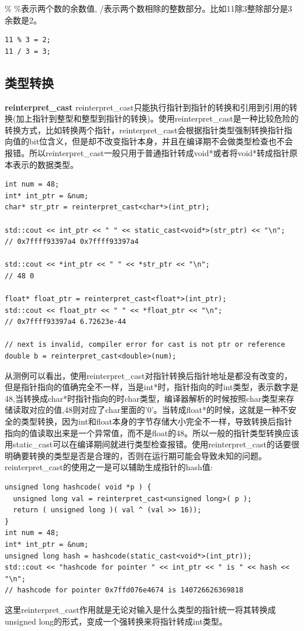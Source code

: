\documentclass[12pt]{book}
\begin{document}
\% \newline
\%表示两个数的余数值, /表示两个数相除的整数部分。比如11除3整除部分是3余数是2。
\begin{lstlisting}
11 % 3 = 2;
11 / 3 = 3;
\end{lstlisting}

\subsection{类型转换}
\textbf{reinterpret\_cast} \newline
reinterpret\_cast只能执行指针到指针的转换和引用到引用的转换(加上指针到整型和整型到指针的转换)。使用reinterpret\_cast是一种比较危险的转换方式，比如转换两个指针，reinterpret\_cast会根据指针类型强制转换指针指向值的bit位含义，但是却不改变指针本身，并且在编译期不会做类型检查也不会报错。所以reinterpret\_cast一般只用于普通指针转成void*或者将void*转成指针原本表示的数据类型。
\begin{lstlisting}
int num = 48;
int* int_ptr = &num;
char* str_ptr = reinterpret_cast<char*>(int_ptr);

std::cout << int_ptr << " " << static_cast<void*>(str_ptr) << "\n";
// 0x7ffff93397a4 0x7ffff93397a4

std::cout << *int_ptr << " " << *str_ptr << "\n";
// 48 0

float* float_ptr = reinterpret_cast<float*>(int_ptr);
std::cout << float_ptr << " " << *float_ptr << "\n";
// 0x7ffff93397a4 6.72623e-44

// next is invalid, compiler error for cast is not ptr or reference
double b = reinterpret_cast<double>(num);  
\end{lstlisting}
从测例可以看出，使用reinterpret\_cast对指针转换后指针地址是都没有改变的，但是指针指向的值确完全不一样，当是int*时，指针指向的时int类型，表示数字是48,当转换成char*时指针指向的时char类型，编译器解析的时候按照char类型来存储读取对应的值,48则对应了char里面的'0'。当转成float*的时候，这就是一种不安全的类型转换，因为int和float本身的字节存储大小完全不一样，导致转换后指针指向的值读取出来是一个异常值，而不是float的48。所以一般的指针类型转换应该用static\_cast可以在编译期间就进行类型检查报错。使用reinterpret\_cast的话要很明确要转换的类型是否是合理的，否则在运行期可能会导致未知的问题。\newline
reinterpret\_cast的使用之一是可以辅助生成指针的hash值:
\begin{lstlisting}
unsigned long hashcode( void *p ) {
  unsigned long val = reinterpret_cast<unsigned long>( p );
  return ( unsigned long )( val ^ (val >> 16));
}
int num = 48;
int* int_ptr = &num;
unsigned long hash = hashcode(static_cast<void*>(int_ptr));
std::cout << "hashcode for pointer " << int_ptr << " is " << hash << "\n";
// hashcode for pointer 0x7ffd076e4674 is 140726626369818
\end{lstlisting}
这里reinterpret\_cast作用就是无论对输入是什么类型的指针统一将其转换成unsigned long的形式，变成一个强转换来将指针转成int类型。
\end{document}
